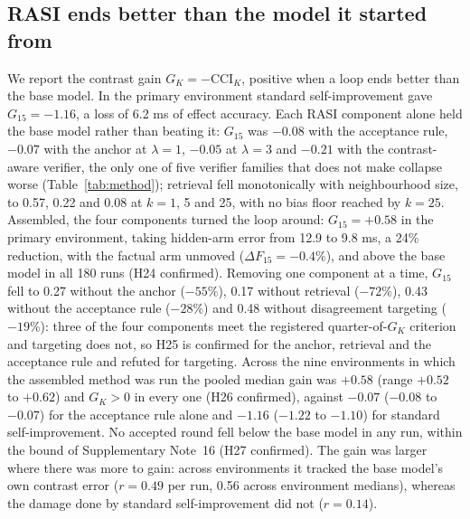 \documentclass[11pt,a4paper]{article}
\newcommand{\CCI}{\mathrm{CCI}}
\begin{document}
\subsection{RASI ends better than the model it started from}
We report the contrast gain $G_K=-\CCI_K$, positive when a loop ends better than the base model. In the primary environment standard self-improvement gave $G_{15}=-1.16$, a loss of 6.2 ms of effect accuracy. Each RASI component alone held the base model rather than beating it: $G_{15}$ was $-0.08$ with the acceptance rule, $-0.07$ with the anchor at $\lambda=1$, $-0.05$ at $\lambda=3$ and $-0.21$ with the contrast-aware verifier, the only one of five verifier families that does not make collapse worse (Table~\ref{tab:method}); retrieval fell monotonically with neighbourhood size, to 0.57, 0.22 and 0.08 at $k=1$, 5 and 25, with no bias floor reached by $k=25$. Assembled, the four components turned the loop around: $G_{15}=+0.58$ in the primary environment, taking hidden-arm error from 12.9 to 9.8 ms, a 24\% reduction, with the factual arm unmoved ($\Delta F_{15}=-0.4\%$), and above the base model in all 180 runs (H24 confirmed). Removing one component at a time, $G_{15}$ fell to 0.27 without the anchor ($-55\%$), 0.17 without retrieval ($-72\%$), 0.43 without the acceptance rule ($-28\%$) and 0.48 without disagreement targeting ($-19\%$): three of the four components meet the registered quarter-of-$G_K$ criterion and targeting does not, so H25 is confirmed for the anchor, retrieval and the acceptance rule and refuted for targeting. Across the nine environments in which the assembled method was run the pooled median gain was $+0.58$ (range $+0.52$ to $+0.62$) and $G_K>0$ in every one (H26 confirmed), against $-0.07$ ($-0.08$ to $-0.07$) for the acceptance rule alone and $-1.16$ ($-1.22$ to $-1.10$) for standard self-improvement. No accepted round fell below the base model in any run, within the bound of Supplementary Note~16 (H27 confirmed). The gain was larger where there was more to gain: across environments it tracked the base model's own contrast error ($r=0.49$ per run, 0.56 across environment medians), whereas the damage done by standard self-improvement did not ($r=0.14$).
\end{document}
